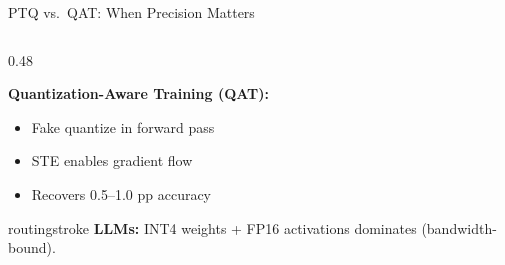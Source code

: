 \documentclass[aspectratio=169, 12pt]{beamer}
\begin{document}
\begin{frame}{PTQ vs.\ QAT: When Precision Matters}
\begin{columns}[T]
\begin{column}{0.48\textwidth}
{    \vspace{0.05cm}
    \textbf{Quantization-Aware Training (QAT):}
    \begin{itemize}\setlength\itemsep{-1pt}
      \item Fake quantize in forward pass
      \item STE enables gradient flow
      \item Recovers 0.5--1.0 pp accuracy
    \end{itemize}
    }

    \vspace{0.05cm}
    \begin{mlsyscard}{routingstroke}
    {\scriptsize \textbf{LLMs:} INT4 weights + FP16 activations dominates (bandwidth-bound).}
    \end{mlsyscard}
  \end{column}
\end{columns}

\end{frame}
\end{document}
